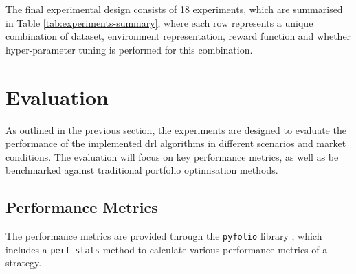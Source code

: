 The final experimental design consists of 18 experiments, which are summarised in Table \ref{tab:experiments-summary}, where each row represents a unique combination of dataset, environment representation, reward function and whether hyper-parameter tuning is performed for this combination.



\section{Evaluation} \label{sec:evaluation}

As outlined in the previous section, the experiments are designed to evaluate the performance of the implemented \acrshort{drl} algorithms in different scenarios and market conditions. The evaluation will focus on key performance metrics, as well as be benchmarked against traditional portfolio optimisation methods. 

\subsection{Performance Metrics} \label{sec:performance-metrics}

The performance metrics are provided through the \texttt{pyfolio} library \cite{pyfolio}, which includes a \texttt{perf\_stats} method to calculate various performance metrics of a strategy. 

